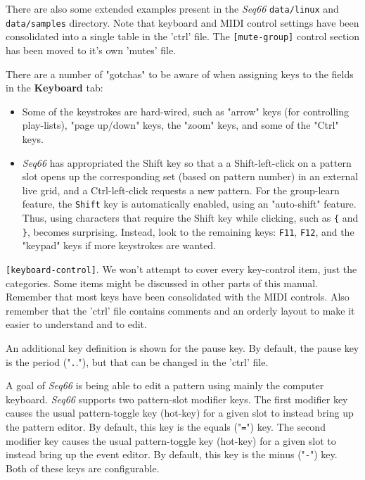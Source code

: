    There are also some extended examples present in the \textsl{Seq66}
   \texttt{data/linux} and
   \texttt{data/samples} directory.
   Note that keyboard and MIDI control settings have been consolidated
   into a single table in the 'ctrl' file.
   The \texttt{[mute-group]} control
   section has been moved to it's own 'mutes' file.

   There are a number of "gotchas" to be aware of when assigning keys to the
   fields in the \textbf{Keyboard} tab:

   \begin{itemize}
      \item Some of the keystrokes are hard-wired, such as 
         "arrow" keys (for controlling play-lists), "page up/down" keys,
         the "zoom" keys, and some of the "Ctrl" keys.
      \item \textsl{Seq66} has appropriated the
          Shift key so that a a Shift-left-click on a pattern
         slot opens up the corresponding set (based on pattern number)
         in an external live grid, and a Ctrl-left-click requests a new pattern.
         For the group-learn feature, the \texttt{Shift} key is 
         automatically enabled, using an "auto-shift" feature.
         Thus, using characters that require the Shift
         key while clicking, such as \texttt{\{} and \texttt{\}},
         becomes surprising.
         Instead, look to the remaining keys: \texttt{F11}, \texttt{F12},
         and the "keypad" keys if more keystrokes are wanted.
   \end{itemize}

   \texttt{[keyboard-control]}.
   We won't attempt to cover every key-control item,
   just the categories.  Some items might be discussed in other parts
   of this manual. Remember that most keys have been consolidated with
   the MIDI controls.
   Also remember that the 'ctrl' file contains comments and an orderly layout
   to make it easier to understand and to edit.

   An additional key definition is shown for the pause key.
   By default, the pause key is the period
   ("\texttt{.}."), but that can be changed in the 'ctrl' file.

   A goal of \textsl{Seq66} is being able to edit a pattern using mainly the
   computer keyboard.
   \textsl{Seq66} supports two pattern-slot modifier keys.
   The first modifier key causes the usual pattern-toggle key (hot-key) for a
   given slot to instead bring up the pattern editor.  By default, this key is
   the equals ("\texttt{=}") key.
   The second modifier key causes the usual
   pattern-toggle key (hot-key) for a given slot to instead bring up the event
   editor.  By default, this key is the minus ("\texttt{-}") key.
   Both of these keys are configurable.

